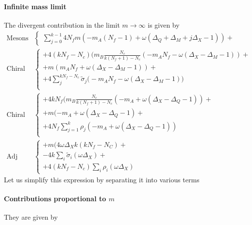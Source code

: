 \begin{appendices}
\paragraph{Infinite mass limit}
The divergent contribution in the limit $m \rightarrow \infty$ is given by
\begin{equation}
\begin{aligned}
\mbox{Mesons}  &\begin{cases}
\sum_{j=0}^{k-1} 4 N_f   m (- m_A (N_f - 1)  + \omega( \Delta_Q +  \Delta_M + j \Delta_X -1  )  ) +
\end{cases}
\\
\mbox{Chiral 1}& \begin{cases}
+  4 ( k N_f - N_c ) \big(  m_B  \frac{N_c}{k (N_f+1) - N_c} (  -  m_A N_f - \omega( \Delta_X - \Delta_M - 1)) +\\
 +  m ( m_A N_f + \omega( \Delta_X - \Delta_M - 1)) + \\
   +  4 \sum_j^{k N_f - N_c} \tilde{\sigma}_j \big( - m_A N_f -  \omega( \Delta_X - \Delta_M - 1) \big) \\
\end{cases}\\
\mbox{Chiral 2} & \begin{cases}
  +    4 k N_f \big(  m_B \frac{N_c}{k (N_f+1) - N_c} (- m_A +  \omega ( \Delta_X - \Delta_Q - 1)) + \\
  +  m ( - m_A +  \omega ( \Delta_X - \Delta_Q - 1)+ \\
+  4 N_f \sum_{j=1}^k  \rho_j ( - m_A +  \omega ( \Delta_X - \Delta_Q - 1) ) \\
\end{cases}\\
\mbox{Adj matter} & \begin{cases}
	+ m( 4 \omega \Delta_X k ( k N_f - N_C) +\\
	- 4 k \sum_i \tilde{\sigma}_i (  \omega \Delta_X ) + \\
	+ 4 (k N_f - N_c)  \sum_i \rho_i(  \omega \Delta_X )
\end{cases}
\end{aligned}
\end{equation}
Let us simplify this expression by separating it into various terms
\paragraph{Contributions proportional to $m$}
They are given by



\end{appendices}
